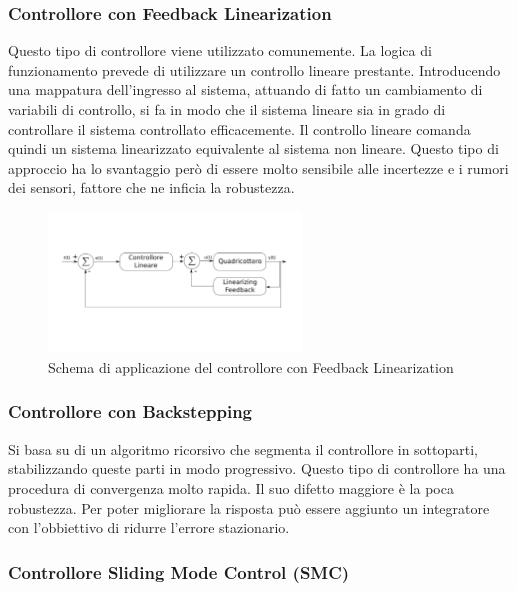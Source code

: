\subsubsection{Controllore con Feedback Linearization}

Questo tipo di controllore viene utilizzato comunemente. La logica di funzionamento prevede di utilizzare un controllo lineare prestante. Introducendo una mappatura dell'ingresso al sistema, attuando di fatto un cambiamento di variabili di controllo, si fa in modo che il sistema lineare sia in grado di controllare il sistema controllato efficacemente. Il controllo lineare comanda quindi un sistema linearizzato equivalente al sistema non lineare. Questo tipo di approccio ha lo svantaggio però di essere molto sensibile alle incertezze e i rumori dei sensori, fattore che ne inficia la robustezza.

\begin{figure}
	\centering
	\includegraphics[width=0.6\textwidth]{SistemaQuadrirotore/Figure/FLP}
	\caption{Schema di applicazione del controllore con Feedback Linearization}
\end{figure}

\subsubsection{Controllore con Backstepping}

Si basa su di un algoritmo ricorsivo che segmenta il controllore in sottoparti, stabilizzando queste parti in modo progressivo. Questo tipo di controllore ha una procedura di convergenza molto rapida. Il suo difetto maggiore è la poca robustezza. Per poter migliorare la risposta può essere aggiunto un integratore con l'obbiettivo di ridurre l'errore stazionario.


\subsubsection{Controllore Sliding Mode Control (SMC)}

